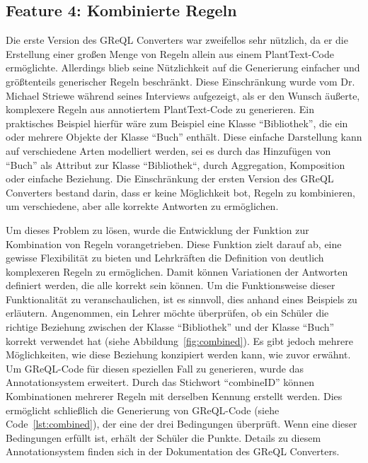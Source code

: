 \subsection{Feature 4: Kombinierte Regeln}

Die erste Version des GReQL Converters war zweifellos sehr nützlich, da er die Erstellung einer großen Menge von Regeln
allein aus einem PlantText-Code ermöglichte. Allerdings blieb seine Nützlichkeit auf die Generierung einfacher und
größtenteils generischer Regeln beschränkt. Diese Einschränkung wurde vom Dr. Michael Striewe während seines Interviews
aufgezeigt, als er den Wunsch äußerte, komplexere Regeln aus annotiertem PlantText-Code zu generieren. Ein praktisches
Beispiel hierfür wäre zum Beispiel eine Klasse ``Bibliothek'', die ein oder mehrere Objekte der Klasse ``Buch'' enthält.
Diese einfache Darstellung kann auf verschiedene Arten modelliert werden, sei es durch das Hinzufügen von ``Buch'' als
Attribut zur Klasse ``Bibliothek``, durch Aggregation, Komposition oder einfache Beziehung. Die Einschränkung der ersten
Version des GReQL Converters bestand darin, dass er keine Möglichkeit bot, Regeln zu kombinieren, um verschiedene, aber
alle korrekte Antworten zu ermöglichen.

Um dieses Problem zu lösen, wurde die Entwicklung der Funktion zur Kombination von Regeln vorangetrieben. Diese Funktion
zielt darauf ab, eine gewisse Flexibilität zu bieten und Lehrkräften die Definition von deutlich komplexeren Regeln zu
ermöglichen. Damit können Variationen der Antworten definiert werden, die alle korrekt sein können. Um die
Funktionsweise dieser Funktionalität zu veranschaulichen, ist es sinnvoll, dies anhand eines Beispiels zu erläutern.
Angenommen, ein Lehrer möchte überprüfen, ob ein Schüler die richtige Beziehung zwischen der Klasse ``Bibliothek'' und
der Klasse ``Buch'' korrekt verwendet hat (siehe Abbildung~\ref{fig:combined}). Es gibt jedoch mehrere Möglichkeiten, wie diese
Beziehung konzipiert werden kann, wie zuvor erwähnt. Um GReQL-Code für diesen speziellen Fall zu generieren, wurde das
Annotationsystem erweitert. Durch das Stichwort ``combineID'' können Kombinationen mehrerer Regeln mit derselben
Kennung erstellt werden. Dies ermöglicht schließlich die Generierung von GReQL-Code (siehe Code~\ref{lst:combined}), der eine der
drei Bedingungen überprüft. Wenn eine dieser Bedingungen erfüllt ist, erhält der Schüler die Punkte. Details zu
diesem Annotationsystem finden sich in der Dokumentation des GReQL Converters.

